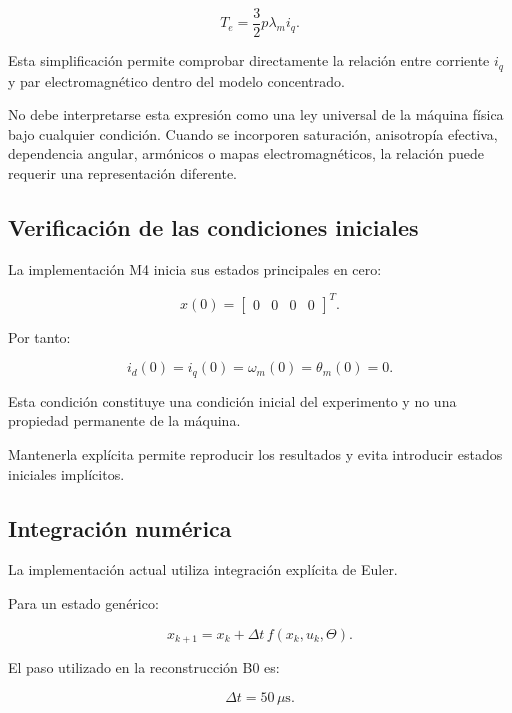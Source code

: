 \begin{equation}
T_e=
\frac{3}{2}p\lambda_mi_q.
\end{equation}

Esta simplificación permite comprobar directamente la relación entre corriente $i_q$ y par electromagnético dentro del modelo concentrado.

No debe interpretarse esta expresión como una ley universal de la máquina física bajo cualquier condición. Cuando se incorporen saturación, anisotropía efectiva, dependencia angular, armónicos o mapas electromagnéticos, la relación puede requerir una representación diferente.

\subsection{Verificación de las condiciones iniciales}

La implementación M4 inicia sus estados principales en cero:

\begin{equation}
x(0)=
\begin{bmatrix}
0&
0&
0&
0
\end{bmatrix}^{T}.
\end{equation}

Por tanto:

\begin{equation}
i_d(0)=i_q(0)=\omega_m(0)=\theta_m(0)=0.
\end{equation}

Esta condición constituye una condición inicial del experimento y no una propiedad permanente de la máquina.

Mantenerla explícita permite reproducir los resultados y evita introducir estados iniciales implícitos.

\subsection{Integración numérica}

La implementación actual utiliza integración explícita de Euler.

Para un estado genérico:

\begin{equation}
x_{k+1}
=
x_k+
\Delta t\,f(x_k,u_k,\Theta).
\end{equation}

El paso utilizado en la reconstrucción B0 es:

\begin{equation}
\Delta t=50\,\mu\mathrm{s}.
\end{equation}

